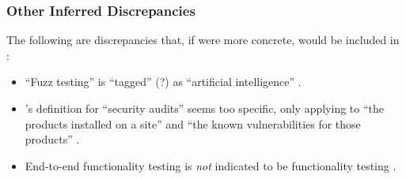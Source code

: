       

      \subsubsection{Other Inferred Discrepancies}
      The following are discrepancies that, if were more concrete, would be
      included in :
      \begin{itemize}
            \item ``Fuzz testing'' is ``tagged'' (?) as ``artificial
                  intelligence'' \citep[p.~5]{IEEE2022}.
            \item \citeauthor{Gerrard2000b}'s definition for ``security
                  audits'' seems too specific, only applying to ``the products
                  installed on a site'' and ``the known vulnerabilities for
                  those products'' \citeyearpar[p.~28]{Gerrard2000b}.
            \item End-to-end functionality testing is \emph{not} indicated to
                  be functionality testing \citep[Tab.~2]{Gerrard2000a}.
      \end{itemize}
\fi